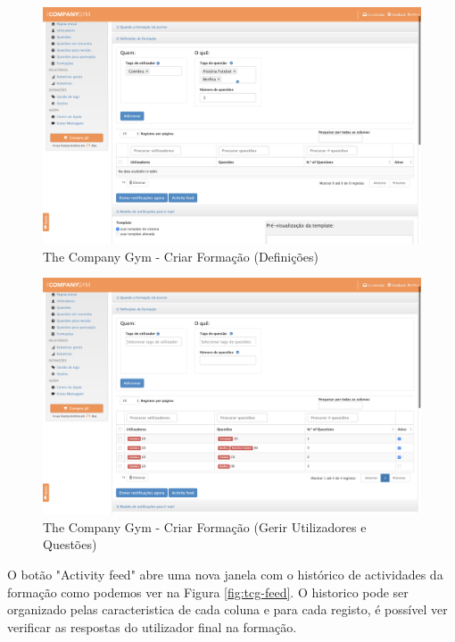  \newpage
 
 
\begin{figure}[ht!]
	\begin{center}
		\includegraphics[width=1\textwidth]{img/tcg/tcg-form1.png}
		\caption{The Company Gym - Criar Formação (Definições)}
		\label{fig:tcg-form1}
	\end{center}
\end{figure}

\begin{figure}[ht!]
	\begin{center}
		\includegraphics[width=1\textwidth]{img/tcg/tcg-form2.png}
		\caption{The Company Gym - Criar Formação (Gerir Utilizadores e Questões)}
		\label{fig:tcg-form2}
	\end{center}
\end{figure}

O botão "Activity feed" abre uma nova janela com o histórico de actividades da formação como podemos ver na Figura \ref{fig:tcg-feed}. O historico pode ser organizado pelas caracteristica de cada coluna e para cada registo, é possível ver verificar as respostas do utilizador final na formação.


